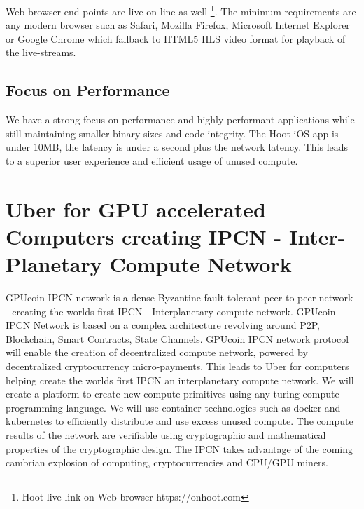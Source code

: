 \documentclass{article}
\begin{document}
Web browser end points are live on line as well
\footnote{Hoot live link on Web browser https://onhoot.com}. The minimum requirements are any modern
browser such as Safari, Mozilla Firefox, Microsoft Internet Explorer or Google Chrome which fallback to HTML5 HLS video format for playback
of the live-streams.

\subsection{Focus on Performance}
We have a strong focus on performance and highly performant applications while still maintaining smaller binary sizes and code integrity. The Hoot iOS app is under 10MB, the latency is under a second plus the network latency. This leads to a superior user experience and efficient usage of unused compute.

\section{Uber for GPU accelerated Computers creating IPCN - Inter-Planetary Compute Network}
GPUcoin IPCN network is a dense Byzantine fault tolerant peer-to-peer network - creating the worlds first IPCN - Interplanetary compute network. GPUcoin IPCN Network is based on a complex architecture revolving around P2P, Blockchain, Smart Contracts, State Channels. GPUcoin IPCN network protocol will enable the creation of decentralized compute network, powered by decentralized cryptocurrency micro-payments. This leads to Uber for computers helping create the worlds first IPCN an interplanetary compute network. We will create a platform to create new compute primitives using any turing compute programming language. We will use container technologies such as docker and kubernetes to efficiently distribute and use excess unused compute. The compute results of the network are verifiable using cryptographic and mathematical properties of the cryptographic design. The IPCN takes advantage of the coming cambrian explosion of computing, cryptocurrencies and CPU/GPU miners.
\end{document}
